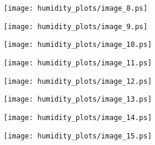 \documentclass[11pt]{amsart}
\theoremstyle{plain}%
\theoremstyle{definition}
\theoremstyle{remark}
\numberwithin{equation}{thm}
\begin{document}
\begin{figure}[H]
\begin{center}
\texttt{[image: humidity\_plots/image\_8.ps]} 
\end{center}
\end{figure}

\begin{figure}[H]
\begin{center}
\texttt{[image: humidity\_plots/image\_9.ps]} 
\end{center}
\end{figure}

\begin{figure}[H]
\begin{center}
\texttt{[image: humidity\_plots/image\_10.ps]} 
\end{center}
\end{figure}

\begin{figure}[H]
\begin{center}
\texttt{[image: humidity\_plots/image\_11.ps]} 
\end{center}
\end{figure}

\begin{figure}[H]
\begin{center}
\texttt{[image: humidity\_plots/image\_12.ps]} 
\end{center}
\end{figure}

\begin{figure}[H]
\begin{center}
\texttt{[image: humidity\_plots/image\_13.ps]} 
\end{center}
\end{figure}

\begin{figure}[H]
\begin{center}
\texttt{[image: humidity\_plots/image\_14.ps]} 
\end{center}
\end{figure}

\begin{figure}[H]
\begin{center}
\texttt{[image: humidity\_plots/image\_15.ps]} 
\end{center}
\end{figure}
\end{document}
